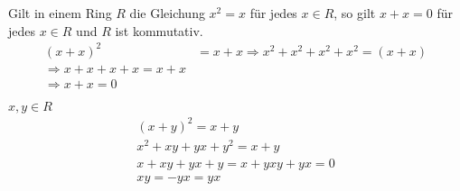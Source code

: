 \documentclass{article}
\begin{document}
\begin{enumerate}[(a)]
        \color{blue}
        Gilt in einem Ring $R$ die Gleichung $x^2=x$ für
        jedes $x\in R$, so gilt $x+x=0$ für jedes
        $x\in R$ und $R$ ist kommutativ.\\
        \color{black}
        \begin{align*}
            (x+x)^2&=x+x
            \Rightarrow x^2+x^2+x^2+x^2=(x+x)\\
            \Rightarrow x+x+x+x=x+x\\
            \Rightarrow x+x=0\\
        \end{align*}
        $x,y\in R$
        \begin{align*}
            (x+y)^2=x+y\\
            x^2+xy+yx+y^2=x+y\\
            x+xy+yx+y=x+y
            xy+yx=0\\
            xy=-yx=yx
        \end{align*}
\end{enumerate}
\section{}
\end{document}

